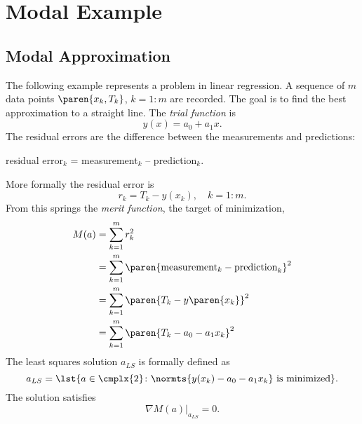 \chapter{\label{ch:archetype modal}Modal Example}

\section{\label{sec:modal problem}Modal Approximation}  %
The following example represents a problem in linear regression. A sequence of $m$ data points $\paren{x_{k}, T_{k}}$, $k=1\colon m$ are recorded. The goal is to find the best approximation to a straight line. The \emph{trial function} is
  \begin{equation*}   %
    y(x) = a_{0} + a_{1} x .
    \label{eq:lr trial}
  \end{equation*}
The residual errors are the difference between the measurements and predictions:\\
\begin{center}
residual error$_{k}$ = measurement$_{k}$ -- prediction$_{k}$.
\end{center} 
 More formally the residual error is
  \begin{equation*}   %
    r_{k} = T_{k} - y(x_{k}), \quad k=1\colon m.
  \end{equation*}
From this springs the \emph{merit function}, the target of minimization,
  \begin{equation}   %
  \begin{split}
    M(a) 
      &= \sum_{k=1}^{m} r_{k}^{2} \\
      &= \sum_{k=1}^{m} \paren{\text{measurement}_{k} - \text{prediction}_{k}}^{2} \\
      &= \sum_{k=1}^{m} \paren{T_{k} - y\paren{x_{k}}}^{2} \\
      &= \sum_{k=1}^{m} \paren{T_{k} - a_{0} - a_{1} x_{k}}^{2}
    \label{eqn:merit}
  \end{split}
  \end{equation}
The least squares solution $a_{LS}$ is formally defined as 
  \begin{equation*}   %
    a_{LS} = \lst{a \in \cmplx{2} \colon \normts{y(x_{k}) - a_{0} - a_{1} x_{k}} \text{ is minimized} }.
  \end{equation*}
The solution satisfies
  \begin{equation}   %
    \nabla M( a )|_{a_{LS}} = 0 .
    \label{eq:gradient lr}
  \end{equation}

